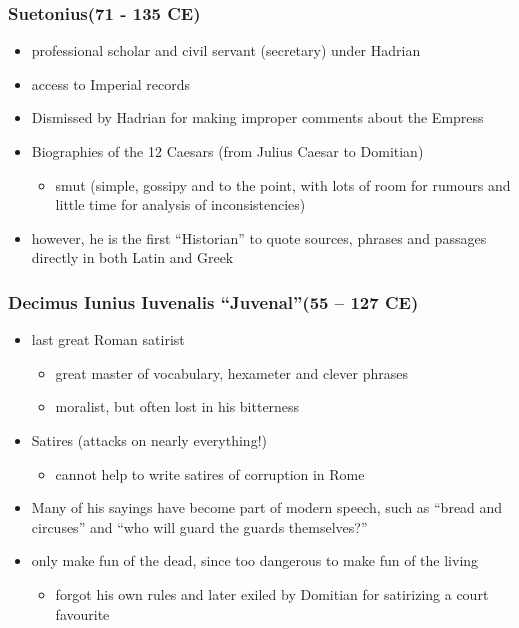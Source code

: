 \documentclass[12pt, twoside]{article}
\begin{document}
\subsubsection{Suetonius(71 - 135 CE)}
\begin{itemize}
\item professional scholar and civil servant (secretary) under Hadrian
\item access to Imperial records
\item Dismissed by Hadrian for making improper comments about the Empress
\item Biographies of the 12 Caesars (from Julius Caesar to Domitian)
	\begin{itemize}
	\item smut (simple, gossipy and to the point, with lots of room for rumours and little time for analysis of inconsistencies) 
	\end{itemize}
\item however, he is the first “Historian” to quote sources, phrases and passages directly in both Latin and Greek
\end{itemize}

\subsubsection{Decimus Iunius Iuvenalis “Juvenal”(55 – 127 CE)}
\begin{itemize}
\item last great Roman satirist
	\begin{itemize}
	\item great master of vocabulary, hexameter and clever phrases
	\item moralist, but often lost in his bitterness
	\end{itemize}
\item Satires (attacks on nearly everything!)
	\begin{itemize}
	\item cannot help to write satires of corruption in Rome
	\end{itemize}
\item Many of his sayings have become part of modern speech, such as “bread and circuses” and “who will guard the guards themselves?”
\item only make fun of the dead, since too dangerous to make fun of the living
	\begin{itemize}
	\item forgot his own rules and later exiled by Domitian for satirizing a court favourite
	\end{itemize}
\end{itemize}
\end{document}
